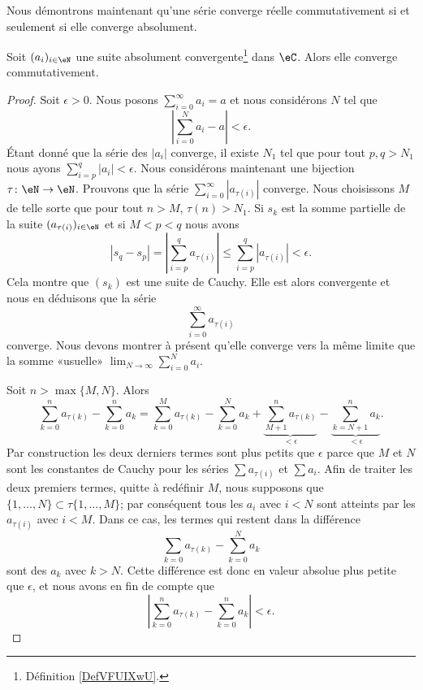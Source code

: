 Nous démontrons maintenant qu'une série converge réelle commutativement si et seulement si elle converge absolument.

\begin{proposition} \label{PopriXWvIY}
    Soit \( (a_i)_{i\in \eN}\) une suite absolument convergente\footnote{Définition \ref{DefVFUIXwU}.} dans \( \eC\). Alors elle converge commutativement.
\end{proposition}

\begin{proof}
    Soit \( \epsilon>0\). Nous posons \( \sum_{i=0}^\infty a_i=a\) et nous considérons \( N\) tel que
    \begin{equation}
        | \sum_{i=0}^Na_i-a |<\epsilon.
    \end{equation}
    Étant donné que la série des \( | a_i |\) converge, il existe \( N_1\) tel que pour tout \( p,q>N_1\) nous ayons \( \sum_{i=p}^q| a_i |<\epsilon\). Nous considérons maintenant une bijection \( \tau\colon \eN\to \eN \). Prouvons que la série \( \sum_{i=0}^{\infty}| a_{\tau(i)} |\) converge. Nous choisissons \( M\) de telle sorte que pour tout \( n>M\), \( \tau(n)>N_1\). Si \( s_k\) est la somme partielle de la suite \( ( a_{\tau(i)} )_{i\in \eN}\) et si \( M<p<q \) nous avons
    \begin{equation}
        | s_q-s_p |= | \sum_{i=p}^q a_{\tau(i)} | \leq \sum_{i=p}^q| a_{\tau(i)} |<\epsilon.
    \end{equation}
    Cela montre que \( (s_k)\) est une suite de Cauchy. Elle est alors convergente et nous en déduisons que la série
    \begin{equation}
        \sum_{i=0}^{\infty}a_{\tau(i)}
    \end{equation}
    converge. Nous devons montrer à présent qu'elle converge vers la même limite que la somme «usuelle» \( \lim_{N\to \infty} \sum_{i=0}^Na_i\).

    Soit \( n>\max\{ M,N \}\). Alors
    \begin{equation}
        \sum_{k=0}^na_{\tau(k)}-\sum_{k=0}^na_k=\sum_{k=0}^Ma_{\tau(k)}-\sum_{k=0}^Na_k+\underbrace{\sum_{M+1}^na_{\tau(k)}}_{<\epsilon}-\underbrace{\sum_{k=N+1}^na_k}_{<\epsilon}.
    \end{equation}
    Par construction les deux derniers termes sont plus petits que \( \epsilon\) parce que \( M\) et \( N\) sont les constantes de Cauchy pour les séries \( \sum a_{\tau(i)}\) et \( \sum a_i\). Afin de traiter les deux premiers termes, quitte à redéfinir \( M\), nous supposons que \( \{ 1,\ldots, N \}\subset \tau\{ 1,\ldots, M \}\); par conséquent tous les \( a_i\) avec \( i<N\) sont atteints par les \( a_{\tau(i)}\) avec \( i<M\). Dans ce cas, les termes qui restent dans la différence
    \begin{equation}
        \sum_{k=0}a_{\tau(k)}-\sum_{k=0}^Na_k
    \end{equation}
    sont des \( a_k\) avec \( k>N\). Cette différence est donc en valeur absolue plus petite que \( \epsilon\), et nous avons en fin de compte que
    \begin{equation}
        \left| \sum_{k=0}^na_{\tau(k)}-\sum_{k=0}^na_k \right| <\epsilon.
    \end{equation}
\end{proof}


